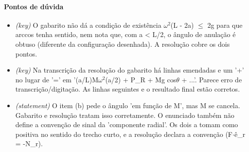 \documentclass{article}%
\begin{document}
\paragraph{Pontos de dúvida}%
\begin{itemize}%
\item%
\textit{(key)} O gabarito não dá a condição de existência $\omega$$^2$(L - 2a) $\leq$ 2g para que arccos tenha sentido, nem nota que, com a < L/2, o ângulo de anulação é obtuso (diferente da configuração desenhada). A resolução cobre os dois pontos.%
\item%
\textit{(key)} Na transcrição da resolução do gabarito há linhas emendadas e um '+' no lugar de '=' em '(a/L)M$\omega$$^2$(a/2) + P\_R + Mg cos$\theta$ + ...'. Parece erro de transcrição/digitação. As linhas seguintes e o resultado final estão corretos.%
\item%
\textit{(statement)} O item (b) pede o ângulo 'em função de M', mas M se cancela. Gabarito e resolução tratam isso corretamente. O enunciado também não define a convenção de sinal da 'componente radial'. Os dois a tomam como positiva no sentido do trecho curto, e a resolução declara a convenção (F$\cdot$ê\_r = -N\_r).%
\end{itemize}%
\end{document}
